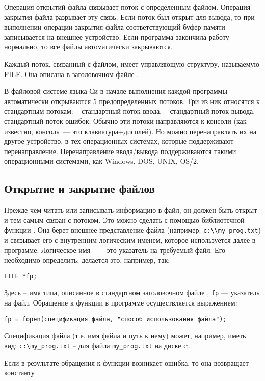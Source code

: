 Операция открытий файла связывает поток с определенным файлом. Операция закрытия файла разрывает эту связь. Если поток был открыт для
вывода, то при выполнении операции закрытия файла соответствующий буфер памяти записывается на внешнее устройство. Если программа закончила
работу нормально, то все файлы автоматически закрываются.

Каждый поток, связанный с файлом, имеет управляющую структуру, называемую FILE. Она описана в заголовочном файле .

В файловой системе языка Си в начале выполнения каждой программы автоматически открываются 5 предопределенных потоков.
Три из ник относятся к стандартным потокам:  – стандартный поток ввода,  – стандартный поток
вывода,  – стандартный поток ошибок. Обычно эти потоки направляются к консоли (как известно, консоль~--- это
клавиатура+дисплей). Но можно перенаправлять их на другое устройство, в тех операционных системах, которые поддерживают
перенаправление. Перенаправление ввода/вывода поддерживаются такими операционными системами, как Windows, DOS, UNIX, OS/2.

\subsection{Открытие и закрытие файлов}
Прежде чем читать или записывать информацию в файл, он должен быть открыт и тем самым связан с потоком. Это можно сделать
с помощью библиотечной функции . Она берет внешнее представление файла (например: \verb|c:\\my_prog.txt|) и связывает его
с внутренним логическим именем, которое используется далее в программе. Логическое имя~---– это указатель на требуемый файл.
Его необходимо определить; делается это, например, так:
\begin{verbatim}
FILE *fp;
\end{verbatim}
Здесь  – имя типа, описанное в стандартном заголовочном файле , \verb|fp| --- указатель на файл.
Обращение к функции  в программе осуществляется выражением:
\begin{verbatim}
fp = fopen(спецификация файла, "способ использования файла");
\end{verbatim}

Спецификация файла (т.е. имя файла и путь к нему) может, например, иметь вид: \verb|c:\my_prog.txt| – для файла \verb|my_prog.txt| на диске с:.

Если в результате обращения к функции  возникает ошибка, то она возвращает константу .

